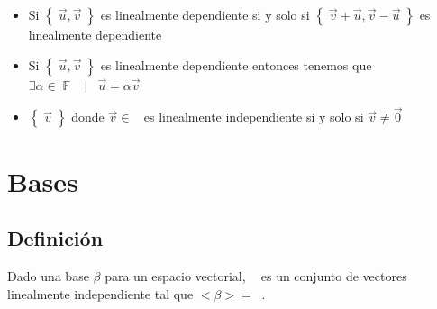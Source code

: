 \documentclass[12pt, fleqn]{report}                             %
\newenvironment{SmallIndentation}[1][0.75em]                    %
        {\begin{adjustwidth}{#1}{}\begin{footnotesize}}             %
        {\end{footnotesize}\end{adjustwidth}}                       %
\DeclareMathOperator \Space     {\quad}                         %
\DeclareMathOperator \MiniSpace {\;}                            %
\newcommand \Such           {\MiniSpace | \MiniSpace}           %
\theoremstyle{break}                                            %
\DeclareMathOperator \GenericField {\mathbb{F}}                 %
\DeclareMathOperator \VectorSet    {\mathbb{V}}                 %
\DeclareMathOperator \VectorSpace  {\VectorSet_{\GenericField}} %
\newcommand{\Set}[1]            {\left\{ \; #1 \; \right\}}     %
\begin{document}
\begin{itemize}
\begin{SmallIndentation}[1em]
                        Por lo tanto podemos dividir todo entre $k$ y despejar y decir que:
                        $\vec v = \sum_{i=0}^n \frac{a_i}{k} \vec v_i$ entonces ya vimos que podemos
                        escribir a $\vec v$ como combinación lineal de elementos de $S$ entonces
                        pertenece al generado de $S$.

                        Y bueno, el regreso es lo mismo n.n
                    
                    \end{SmallIndentation}
                        

                \item 
                    Si $\Set{ \vec u, \vec v}$ es linealmente dependiente si y solo si
                    $\Set{\vec v + \vec u, \vec v - \vec u}$ es linealmente dependiente

                \item
                    Si $\Set{ \vec u, \vec v}$ es linealmente dependiente entonces
                    tenemos que $\exists \alpha \in \GenericField \Such \vec u = \alpha \vec v$

                \item $\Set{\vec v}$ donde $\vec v \in \VectorSpace$ es linealmente independiente si 
                y solo si $\vec v \neq \vec 0$

            \end{itemize}


        \clearpage
        \section{Bases}


            \subsection{Definición}

                Dado una base $\beta$ para un espacio vectorial, $\VectorSpace$ es un conjunto
                de vectores linealmente independiente tal que $<\beta> = \VectorSpace$.
\end{document}
